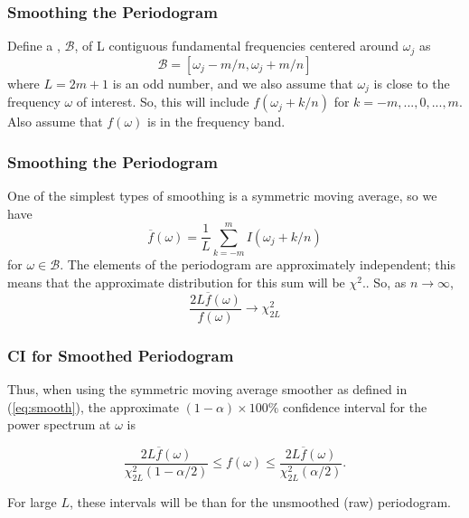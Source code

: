 \documentclass[%
xcolor=pdftex]{beamer}
\begin{document}
\begin{frame}
\frametitle{Smoothing the Periodogram}

Define a \underline{\hspace{20 mm}} \underline{\hspace{10 mm}}, $\mathcal{B}$, of L contiguous fundamental frequencies centered
around $\omega_j$ as
\begin{equation} \label{eq:band}
\mathcal{B}=[\omega_j-m/n, \omega_j+m/n]
\end{equation}
where $L=2m+1$ is an odd number, and we also assume that
$\omega_j$ is close to the frequency $\omega$ of interest. So,
this will include $f(\omega_j+k/n)$ for $k=-m,...,0,...,m$. Also assume that $f(\omega)$ is \underline{\hspace{40 mm}} in the frequency band.

\end{frame}

\begin{frame}
\frametitle{Smoothing the Periodogram}

One of the simplest types of smoothing is a symmetric moving average, so we have
\begin{equation} \label{eq:smooth}
\overline{f}(\omega)=\frac{1}{L} \sum_{k=-m}^{m} I(\omega_j + k/n)
\end{equation}
for $\omega \in \mathcal{B}$. The elements of the periodogram
are approximately independent; this means that the approximate
distribution for this sum will be $\chi^2$..
So, as $n \to \infty$,
\begin{equation} \label{eq:chi}
\frac{2 L  \overline{f}(\omega)}{f(\omega)} \rightarrow \chi_{2 L}^2
\end{equation}

\end{frame}

\begin{frame}
\frametitle{CI for Smoothed Periodogram}

Thus, when using the symmetric moving average smoother as defined in (\ref{eq:smooth}), the approximate $(1-\alpha) \times 100\%$ confidence interval for the power spectrum at $\omega$ is

\begin{equation} \label{eq:CI}
\frac{2 L  \overline{f}(\omega)}{{\chi_{2L}^2(1-\alpha/2)}} \leq f(\omega) \leq \frac{2 L  \overline{f}(\omega)}{{\chi_{2L}^2(\alpha/2)}} .
\end{equation}

For large $L$, these intervals will be \underline{\hspace{15 mm}} than for the unsmoothed (raw) periodogram.

\end{frame}
\end{document}
